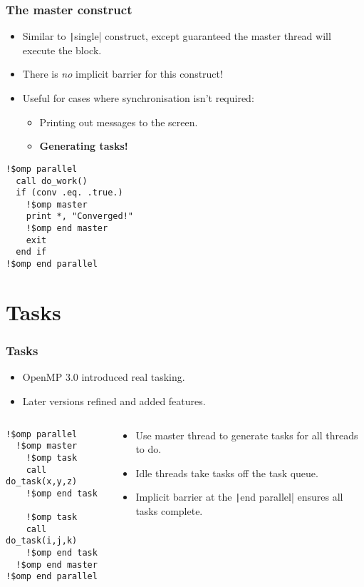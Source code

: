 \documentclass{beamer}
\begin{document}
\begin{frame}[fragile]
\frametitle{The master construct}
\begin{itemize}
  \item Similar to \texttt|single| construct, except guaranteed the master thread will execute the block.
  \item There is \emph{no} implicit barrier for this construct!
  \item Useful for cases where synchronisation isn't required:
    \begin{itemize}
      \item Printing out messages to the screen.
      \item {\bf Generating tasks!}
    \end{itemize}
\end{itemize}

\begin{verbatim}
!$omp parallel
  call do_work()
  if (conv .eq. .true.)
    !$omp master
    print *, "Converged!"
    !$omp end master
    exit
  end if
!$omp end parallel
\end{verbatim}
\end{frame}

\section{Tasks}
\begin{frame}[fragile]
\frametitle{Tasks}
\begin{itemize}
  \item OpenMP 3.0 introduced real tasking.
  \item Later versions refined and added features.
\end{itemize}

\begin{columns}
\begin{column}{0.5\textwidth}
\begin{verbatim}
!$omp parallel
  !$omp master
    !$omp task
    call do_task(x,y,z)
    !$omp end task

    !$omp task
    call do_task(i,j,k)
    !$omp end task
  !$omp end master
!$omp end parallel
\end{verbatim}
\end{column}

\begin{column}{0.5\textwidth}
\begin{itemize}
  \item Use master thread to generate tasks for all threads to do.
  \item Idle threads take tasks off the task queue.
  \item Implicit barrier at the \texttt|end parallel| ensures all tasks complete.
\end{itemize}
\end{column}
\end{columns}

\end{frame}
\end{document}
